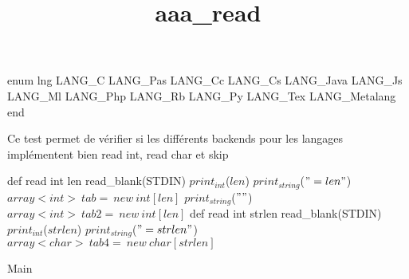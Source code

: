 \documentclass[8pt]{article}
\title{aaa\_read}
\begin{document}
\maketitle


enum lng 
  LANG\_C
   LANG\_Pas
   LANG\_Cc
   LANG\_Cs
   LANG\_Java
   LANG\_Js
   LANG\_Ml
   LANG\_Php
   LANG\_Rb
   LANG\_Py
   LANG\_Tex
   LANG\_Metalang
end


Ce test permet de v\'erifier si les diff\'erents backends pour les langages impl\'ementent bien
read int, read char et skip


\begin{algorithm}[H]
def read int len
read\_blank(STDIN)\;
$print_{int}$($ len $)\;
$print_{string}$($ "=len
" $)\;
$array<int>\:tab=\:new\:int[len]$\;
$print_{string}$($ "
" $)\;
$array<int>\:tab2=\:new\:int[len]$\;
def read int strlen
read\_blank(STDIN)\;
$print_{int}$($ strlen $)\;
$print_{string}$($ "=strlen
" $)\;
$array<char>\:tab4=\:new\:char[strlen]$\;

\caption{Main}
\end{algorithm}
\end{document}
